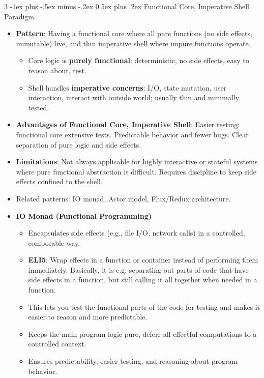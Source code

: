 \documentclass[a4paper, 9pt, landscape]{extarticle}
\makeatletter
\renewcommand{\subsection}{\@startsection{subsubsection}{3}{0mm}%
                                {-1ex plus -.5ex minus -.2ex}%
                                {0.5ex plus .2ex}%
                                {\normalfont\small\bfseries}}
\makeatother
\begin{document}
\begin{multicols*}{3}
\subsection{Functional Core, Imperative Shell Paradigm}
\begin{itemize}
  \item \textbf{Pattern}: Having a functional core where all pure functions (no side effects, immutable) live, and thin imperative shell where impure functions operate.
  \begin{itemize}
    \item Core logic is \textbf{purely functional}: deterministic, no side effects, easy to reason about, test.
    \item Shell handles \textbf{imperative concerns}: I/O, state mutation, user interaction, interact with outside world; usually thin and minimally tested.
  \end{itemize}
  \item \textbf{Advantages of Functional Core, Imperative Shell}: Easier testing: functional core extensive tests. Predictable behavior and fewer bugs. Clear separation of pure logic and side effects.
  \item \textbf{Limitations}: Not always applicable for highly interactive or stateful systems where pure functional abstraction is difficult. Requires discipline to keep side effects confined to the shell.
  \item Related patterns: IO monad, Actor model, Flux/Redux architecture.
  \item \textbf{IO Monad (Functional Programming)}  
  \begin{itemize}
    \item Encapsulates side effects (e.g., file I/O, network calls) in a controlled, composable way.
    \item \textbf{ELI5}: Wrap effects in a function or container instead of performing them immediately. Basically, it is e.g. separating out parts of code that have side effects in a function, but still calling it all together when needed in a function.
    \item This lets you test the functional parts of the code for testing and makes it easier to reason and more predictable.
    \item Keeps the main program logic pure, deferr all effectful computations to a controlled context.
    \item Ensures predictability, easier testing, and reasoning about program behavior.
  \end{itemize}


\end{itemize}
\end{multicols*}
\end{document}
